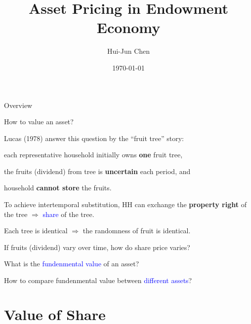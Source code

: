 \documentclass[aspectratio=169,xcolor=dvipsnames]{beamer}
\title[Asset Pricing (Endowment)]{Asset Pricing in Endowment Economy}
\author[Hui-Jun Chen]{Hui-Jun Chen}
\institute[NTHU]{National Tsing Hua University}
\date{\today}
\newcommand{\blue}[1]{\textcolor{blue}{#1}}
\let\tempone\itemize
\let\temptwo\enditemize
\renewenvironment{itemize}{\tempone\addtolength{\itemsep}{\fill}}{\temptwo}
\begin{document}
\begin{frame}
    \titlepage
\end{frame}

\begin{frame}{Overview}
\label{slide:Overview}
    \begin{center}
        How to value an asset?
    \end{center}
    \begin{itemize}
        \item Lucas (1978) answer this question by the ``fruit tree'' story:
        \begin{itemize}
            \item each representative household initially owns \textbf{one} fruit tree,
            \item the fruits (dividend) from tree is \textbf{uncertain} each period, and
            \item household \textbf{cannot store} the fruits.
        \end{itemize}
        \item To achieve intertemporal substitution, HH can exchange the \textbf{property right} of the tree $ \Rightarrow  $ \blue{share} of the tree.
        \begin{itemize}
            \item Each tree is identical $ \Rightarrow  $ the randomness of fruit is identical.
            \item If fruits (dividend) vary over time, how do share price varies?
            \item What is the \blue{fundenmental value} of an asset?
            \item How to compare fundenmental value between \blue{different assets}?
        \end{itemize}
    \end{itemize}
\end{frame}

\section{Value of Share}
\label{sec:Value_of_Share}
\end{document}
